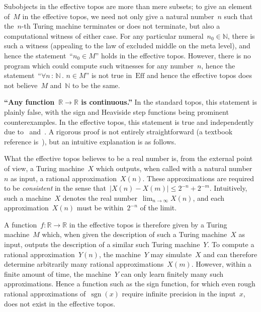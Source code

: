 \documentclass[graybox]{svmult}
\newcommand{\NN}{\mathbb{N}}
\newcommand{\RR}{\mathbb{R}}
\newcommand{\Eff}{\mathrm{Ef{}f}}
\renewcommand{\_}{\mathpunct{.}\,}
\newcommand{\effective}{ef{}fective\xspace}
\newcommand{\?}{\,{:}\,}
\begin{document}
\begin{example}
Subobjects in the \effective topos are more than mere subsets; to give an
element of~$M$ in the \effective topos, we need not only give a natural
number~$n$ such that the~$n$-th Turing machine terminates or does not
terminate, but also a computational witness of either case. For any particular
numeral~$n_0 \in \NN$, there is such a witness (appealing to the law of
excluded middle on the meta level), and hence the statement~``$n_0
\in M$'' holds in the \effective topos. However, there is no program which
could compute such witnesses for any number~$n$, hence the statement~``$\forall
n\?\NN\_ n \in M$'' is not true in~$\Eff$ and hence the \effective topos does not believe~$M$
and~$\NN$ to be the same.
\end{example}

\begin{example}\textbf{``Any function~$\RR \to \RR$ is continuous.''}\label{sect:eff-continuous}
In the standard topos, this statement is plainly false, with the sign and Heaviside step functions
being prominent counterexamples. In the \effective topos, this statement is
true and independently due to~\cite{kreisel-lacombe-shoenfield:cont} and~\cite{ceitin:cont}. A rigorous proof is not entirely
straightforward (a textbook reference
is~\cite[Theorem~9.2.1]{longley-normann:higher-order-computability}), but an intuitive
explanation is as follows.

What the \effective topos believes to be a real number is, from the external
point of view, a Turing machine~$X$ which outputs, when called with a natural
number~$n$ as input, a rational approximation~$X(n)$. These approximations are
required to be \emph{consistent} in the sense that~$|X(n) - X(m)|
\leq 2^{-n} + 2^{-m}$. Intuitively, such a machine~$X$ denotes the real
number~$\lim_{n \to \infty} X(n)$, and each approximation~$X(n)$ must be
within~$2^{-n}$ of the limit.

A function~$f : \RR \to \RR$ in the \effective topos is therefore given by a
Turing machine~$M$ which, when given the description of such a Turing machine~$X$ as
input, outputs the description of a similar such Turing machine~$Y$.
To compute a rational approximation~$Y(n)$, the machine~$Y$ may simulate~$X$
and can therefore determine arbitrarily many rational approximations~$X(m)$.
However, within a finite amount of time, the machine~$Y$ can only learn finitely many
such approximations. Hence a function such as the sign function, for which
even rough rational approximations of~$\operatorname{sgn}(x)$ require infinite
precision in the input~$x$, does not exist in the \effective topos.
\end{example}
\end{document}
